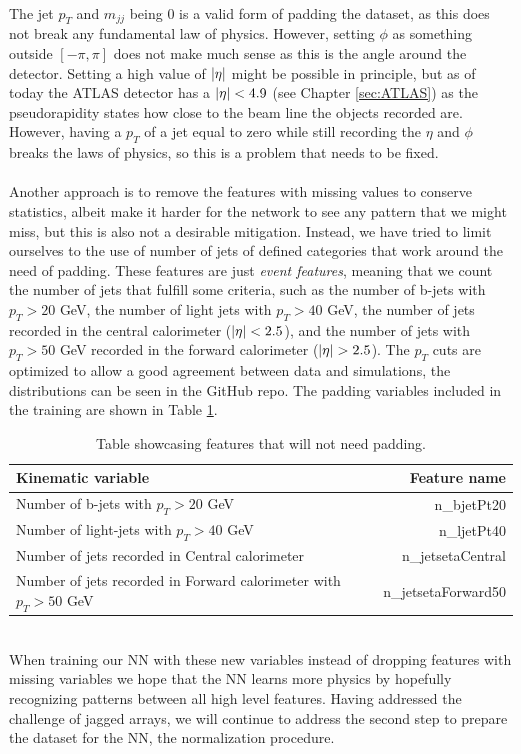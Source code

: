 \documentclass[12pt, a4paper]{book}
\begin{document}
\\The jet $p_T$ and $m_{jj}$ being 0 is a valid form of padding the dataset, as this does not break any fundamental law of physics. However, setting $\phi$ as something outside $[-\pi,\pi]$ does not make much sense 
as this is the angle around the detector. Setting a high value of $\abs{\eta}$ might be possible in principle, but as of today the ATLAS detector has a $\abs{\eta}<4.9$ (see Chapter \ref{sec:ATLAS}) as the pseudorapidity 
states how close to the beam line the objects recorded are. However, having a $p_T$ of a jet equal to zero while still recording the $\eta$ and $\phi$ breaks the laws of physics, so this is a problem that needs to be fixed.\\
\\Another approach is to remove the features with missing values to conserve statistics, albeit make it harder for the network to see any pattern that we might miss, but this is also not a desirable mitigation. 
Instead, we have tried to limit ourselves to the use of number of jets of defined categories that work around the need of padding. These features are just \textit{event features}, meaning that we count the number of jets that fulfill some criteria, 
such as the number of b-jets with $p_T > 20$ GeV, the number of light jets with $p_T>40$ GeV, the number of jets recorded in the central calorimeter ($\abs{\eta} < 2.5$), and the number of 
jets with $p_T>50$ GeV recorded in the forward calorimeter ($\abs{\eta} > 2.5$). The $p_T$ cuts are optimized to allow a good agreement between data and simulations, the distributions can be seen in the GitHub repo. 
The padding variables included in the training are shown in Table \ref{tab:padding_variables}.\\
\begin{table}[!h]
   \centering
   \caption[New features that need no padding]{Table showcasing features that will not need padding.}
   \begin{tabular}{l|r}\midrule\midrule
      Kinematic variable                                                      & Feature name          \\\midrule
      Number of b-jets with $p_T > 20$ GeV                                    & n\_bjetPt20\\
      Number of light-jets with $p_T > 40$ GeV                                & n\_ljetPt40\\
      Number of jets recorded in Central calorimeter                          &n\_jetsetaCentral\\
      Number of jets recorded in Forward calorimeter with $p_T > 50$ GeV      & n\_jetsetaForward50\\\midrule\midrule
   \end{tabular}
   \label{tab:padding_variables}
\end{table}
\\When training our NN with these new variables instead of dropping features with missing variables we hope that the NN learns more physics by hopefully recognizing patterns between all high level features. Having addressed the challenge of jagged arrays, we will continue to 
address the second step to prepare the dataset for the NN, the normalization procedure. 
\end{document}
